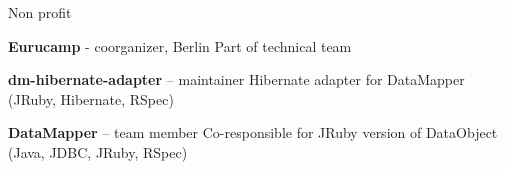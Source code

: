 \begin{rubric}{Non profit}


\entry*[2012--2013]
  \textbf{Eurucamp} - coorganizer, Berlin
\entry*
  Part of technical team

  
  
\entry*[01.2010--\ldots]
  \textbf{dm-hibernate-adapter} -- maintainer
\entry*
  Hibernate adapter for DataMapper (JRuby, Hibernate, RSpec)

\entry*[01.2009--12.2009]
  \textbf{DataMapper}  -- team member
\entry*
  Co-responsible for JRuby version of DataObject (Java, JDBC, JRuby, RSpec)
  
\end{rubric}